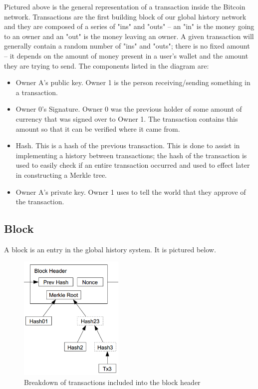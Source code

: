\documentclass[pdftex,11pt]{article}
\begin{document}
Pictured above is the general representation of a transaction inside the Bitcoin network. Transactions are the first building block of our global history network and they are composed of a series of "ins" and "outs" -- an "in" is the money going to an owner and an "out" is the money leaving an owner. A given transaction will generally contain a random number of "ins" and "outs"; there is no fixed amount -- it depends on the amount of money present in a user's wallet and the amount they are trying to send.  The components listed in the diagram are:
\begin{itemize}
	\item Owner A's public key. Owner 1 is the person receiving/sending something in a transaction.
	\item Owner 0's Signature. Owner 0 was the previous holder of some amount of currency that was signed over to Owner 1. The transaction contains this amount so that it can be verified where it came from.
	\item Hash. This is a hash of the previous transaction. This is done to assist in implementing a history between transactions; the hash of the transaction is used to easily check if an entire transaction occurred and used to effect later in constructing a Merkle tree.
	\item Owner A's private key. Owner 1 uses to tell the world that they approve of the transaction.
\end{itemize}

\subsection{Block}
A block is an entry in the global history system. It is pictured below.

\begin{figure}[H]
	\centering
	\includegraphics[width=50mm]{figures/block.png}
	\caption{Breakdown of transactions included into the block header}
	\label{block}
\end{figure}
\end{document}
